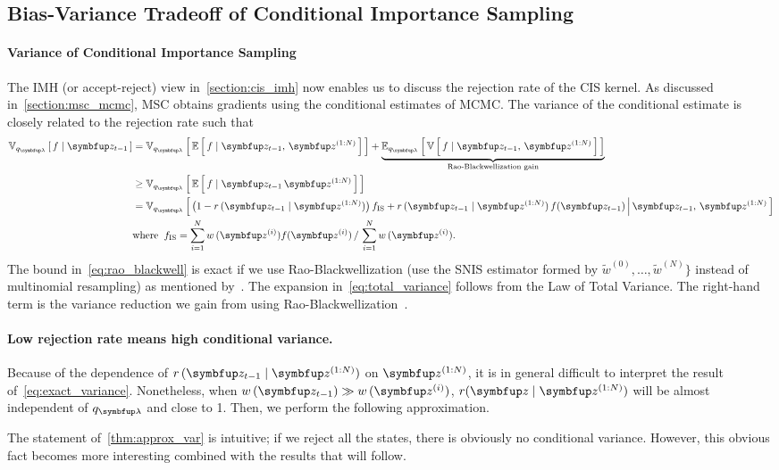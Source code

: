 \subsection{Bias-Variance Tradeoff of Conditional Importance Sampling}\label{section:bias_variance}
\paragraph{Variance of Conditional Importance Sampling}
The IMH (or accept-reject) view in~\cref{section:cis_imh} now enables us to discuss the rejection rate of the CIS kernel.
As discussed in~\cref{section:msc_mcmc}, MSC obtains gradients using the conditional estimates of MCMC.
The variance of the conditional estimate is closely related to the rejection rate such that
\begin{align}
  \Vsub{q_{\vlambda}}{f \mid \vz_{t-1}} &= \Vsub{q_{\vlambda}}{ \E{ f \mid \vz_{t-1},\,\vz^{(1:N)} } } + \underbrace{\Esub{q_{\vlambda}}{ \V{ f \mid \vz_{t-1},\,\vz^{(1:N)} } }}_{\text{Rao-Blackwellization gain}} \label{eq:total_variance} \\
  &\geq \Vsub{q_{\vlambda}}{ \E{ f \mid \vz_{t-1}\,\vz^{(1:N)} } } \label{eq:rao_blackwell}\\
  &= \Vsub{q_{\vlambda}}{ \big(1 - r\,(\vz_{t-1}\mid\vz^{(1:N)})\big)\, f_{\mathrm{IS}}
    + r\,(\vz_{t-1}\mid\vz^{(1:N)})\,f(\vz_{t-1}) \,\middle\vert\, \vz_{t-1},\, \vz^{(1:N)} } \label{eq:exact_variance} \\
  &\text{where}\;\; f_{\mathrm{IS}} = {\sum_{i=1}^N w\,(\vz^{(i)}) f(\vz^{(i)})\,/\,\sum_{i=1}^N w\,(\vz^{(i)})}. \nonumber 
\end{align}
%
The bound in~\eqref{eq:rao_blackwell} is exact if we use Rao-Blackwellization (use the SNIS estimator formed by \(\widetilde{w}^{(0)}, \ldots, \widetilde{w}^{(N)}\}\) instead of multinomial resampling) as mentioned by~\citet{NEURIPS2020_b2070693}.
The expansion in~\eqref{eq:total_variance} follows from the Law of Total Variance.
The right-hand term is the variance reduction we gain from using Rao-Blackwellization~\citep{bernton_locally_2015}.

\vspace{-0.1in}
\paragraph{Low rejection rate means high conditional variance.}
Because of the dependence of \(r\,(\vz_{t-1}\mid\vz^{(1:N)})\) on \(\vz^{(1:N)}\), it is in general difficult to interpret the result of~\eqref{eq:exact_variance}.
Nonetheless, when \(w\,(\vz_{t-1}) \gg w\,(\vz^{(i)})\), \(r(\vz\mid\vz^{(1:N)})\) will be almost independent of \(q_{\vlambda}\) and close to 1.
Then, we perform the following approximation.
%

%
The statement of~\cref{thm:approx_var} is intuitive; if we reject all the states, there is obviously no conditional variance.
However, this obvious fact becomes more interesting combined with the results that will follow.

